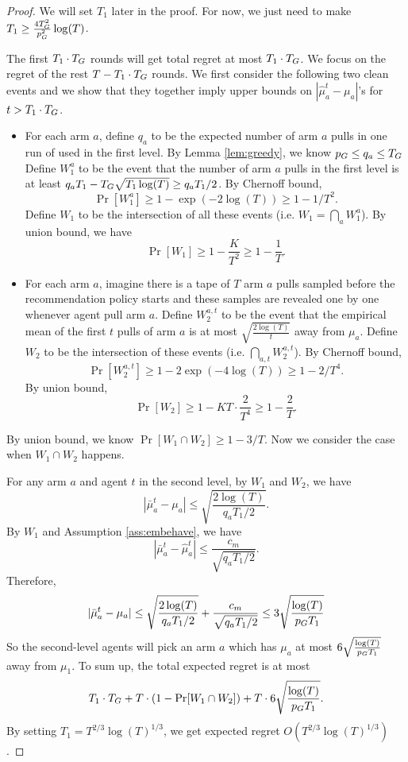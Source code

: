 \begin{proof}
We will set $T_1$ later in the proof. For now, we just need to make $T_1 \geq \frac{4T_G^2}{p_G^2}\log(T)$.

The first $T_1 \cdot T_G$ rounds will get total regret at most $T_1 \cdot T_G$.  We focus on the regret of the rest $T - T_1 \cdot T_G$ rounds. We first consider the following two clean events and we show that they together imply upper bounds on $|\hat{\mu}^t_a - \mu_a|$'s for $t > T_1 \cdot T_G$.

\begin{itemize}
\item For each arm $a$, define $q_a$ to be the expected number of arm $a$ pulls in one run of \ALGG used in the first level. By Lemma \ref{lem:greedy}, we know $p_G \leq q_a \leq T_G$ Define $W_1^a$ to be the event that the number of arm $a$ pulls in the first level is at least $q_a T_1- T_G \sqrt{T_1\log(T)} \geq q_a T_1 / 2$. By Chernoff bound,
\[
\Pr[W_1^a] \geq 1-\exp(-2\log(T)) \geq 1-1/T^2.
\]
Define $W_1$ to be the intersection of all these events (i.e. $W_1 = \bigcap_{a}W_1^a$). By union bound, we have
\[
\Pr[W_1] \geq 1- \frac{K}{T^2} \geq 1 - \frac{1}{T}.
\]
\item For each arm $a$, imagine there is a tape of $T$ arm $a$ pulls sampled before the recommendation policy starts and these samples are revealed one by one whenever agent pull arm $a$. Define $W^{a,t}_2$ to be the event that the empirical mean of the first $t$ pulls of arm $a$ is at most $\sqrt{\frac{2\log(T)}{t}}$ away from $\mu_a$. Define $W_2$ to be the intersection of these events (i.e. $\bigcap_{a,t} W^{a,t}_2$).
By Chernoff bound,
\[
\Pr[W^{a,t}_2] \geq 1 - 2\exp(-4\log(T)) \geq 1-2/T^4.
\]
By union bound, 
\[
\Pr[W_2] \geq 1 - KT \cdot \frac{2}{T^4} \geq 1 - \frac{2}{T}.
\]
\end{itemize}

By union bound, we know $\Pr[W_1 \cap W_2] \geq 1 - 3/T$. Now we consider the case when $W_1 \cap W_2$ happens. 

For any arm $a$ and agent $t$ in the second level, by $W_1$ and $W_2$, we have
\[
|\bar{\mu}^t_a - \mu_a| \leq \sqrt{\frac{2\log(T)}{q_aT_1 /2}}.
\]
By $W_1$ and Assumption \ref{ass:embehave}, we have
\[
|\bar{\mu}^t_a - \hat{\mu}^t_a| \leq \frac{c_m}{\sqrt{q_aT_1/2}}.
\]
Therefore,
\[
|\bar{\mu}^t_a - \mu_a|\leq \sqrt{\frac{2\log(T)}{q_aT_1 /2}}+\frac{c_m}{\sqrt{q_aT_1/2}} \leq 3 \sqrt{\frac{\log(T)}{p_G T_1 }}
\]
So the second-level agents will pick an arm $a$ which has $\mu_a$ at most $6 \sqrt{\frac{\log(T)}{p_G T_1 }}$ away from $\mu_1$. To sum up, the total expected regret is at most 
\[
T_1 \cdot T_G + T \cdot (1-\Pr[W_1 \cap W_2]) + T \cdot  6 \sqrt{\frac{\log(T)}{p_G T_1 }}.
\]
By setting $T_1 = T^{2/3}\log(T)^{1/3}$, we get expected regret $O(T^{2/3}\log(T)^{1/3})$.


\end{proof}
